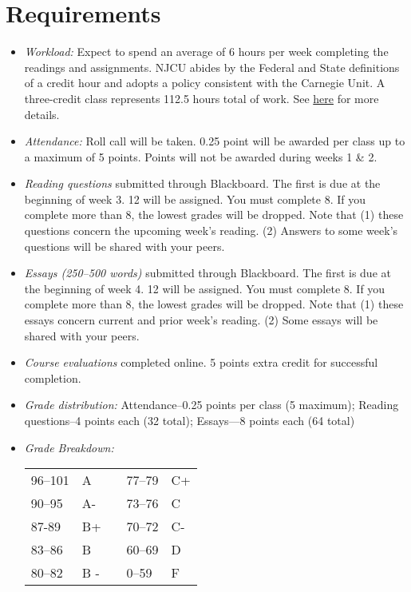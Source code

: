 \documentclass[article,oneside]{memoir}
\begin{document}
\section{Requirements}


\begin{itemize}
\item \textit{Workload:} Expect to spend an average of 6 hours per week completing the readings and assignments. NJCU abides by the Federal and State definitions of a credit hour and adopts a policy consistent with the Carnegie Unit. A three-credit class represents 112.5 hours total of work. See \href{http://scoconno.github.io/Teaching/Credit.pdf}{here} for more details.

\item \textit{Attendance:} Roll call will be taken. 0.25 point will be awarded per class up to a maximum of 5 points. Points will not be awarded during weeks 1 \& 2. 

\item \textit{Reading questions} submitted through Blackboard. The first is due at the beginning of week 3. 12 will be assigned. You must complete 8. If you complete more than 8, the lowest grades will be dropped.  Note that (1) these questions concern the upcoming week's reading. (2) Answers to some week's questions will be shared with your peers.

\item \textit{Essays (250--500 words)} submitted through Blackboard. The first is due at the beginning of week 4.  12 will be assigned. You must complete 8. If you complete more than 8, the lowest grades will be dropped. Note that (1) these essays concern current and prior week's reading. (2) Some essays will be shared with your peers.


\item \textit{Course evaluations} completed online. 5 points extra credit for successful completion.
  
\item \textit{Grade distribution:} Attendance--0.25 points per class (5 maximum);   Reading questions--4 points each (32 total); Essays---8 points each (64 total)

\item \textit{Grade Breakdown:}

 \begin{tabular}{ | l | l | p{2cm} | l | l | }
    \hline 
96--101 & A  & &  77--79 &  C+ \\  
90--95 & A- & &  73--76 & C \\
87-89 & B+ &  &  70--72 & C- \\ 
83--86 & B  & &  60--69 & D\\
80--82 & B - & & 0--59 & F\\ \hline
    \end{tabular}


\end{itemize}
\end{document}
